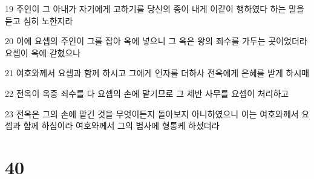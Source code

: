 \par 19 주인이 그 아내가 자기에게 고하기를 당신의 종이 내게 이같이 행하였다 하는 말을 듣고 심히 노한지라
\par 20 이에 요셉의 주인이 그를 잡아 옥에 넣으니 그 옥은 왕의 죄수를 가두는 곳이었더라 요셉이 옥에 갇혔으나
\par 21 여호와께서 요셉과 함께 하시고 그에게 인자를 더하사 전옥에게 은혜를 받게 하시매
\par 22 전옥이 옥중 죄수를 다 요셉의 손에 맡기므로 그 제반 사무를 요셉이 처리하고
\par 23 전옥은 그의 손에 맡긴 것을 무엇이든지 돌아보지 아니하였으니 이는 여호와께서 요셉과 함께 하심이라 여호와께서 그의 범사에 형통케 하셨더라

\chapter{40}

